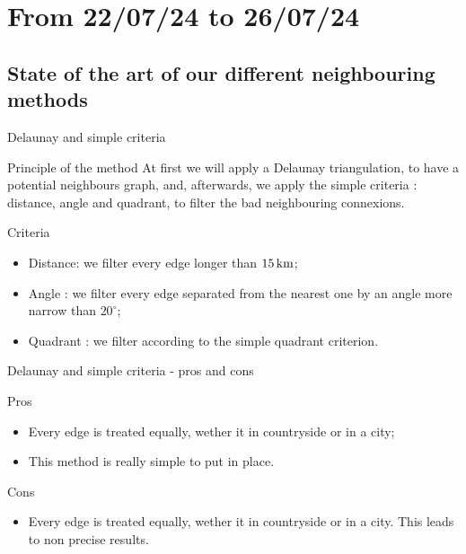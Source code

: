 \smallframetitle

\section{From 22/07/24 to 26/07/24}
\insertsectionframe

\subsection{State of the art of our different neighbouring methods}
\insertsubsectionframe

\begin{frame}{Delaunay and simple criteria}
    \begin{block}{Principle of the method}
        At first we will apply a Delaunay triangulation, to have a potential neighbours graph, and, afterwards, we apply the simple criteria : distance, angle and quadrant,
        to filter the bad neighbouring connexions.
    \end{block}

    \begin{block}{Criteria}
        \begin{itemize}
            \item Distance: we filter every edge longer than $\unit[15]{km}$;
            \item Angle : we filter every edge separated from the nearest one by an angle more narrow than $20^\circ$;
            \item Quadrant : we filter according to the simple quadrant criterion.
        \end{itemize}
    \end{block}
\end{frame}

\begin{frame}{Delaunay and simple criteria - pros and cons}
    \begin{block}{Pros}
        \begin{itemize}
            \item Every edge is treated equally, wether it in countryside or in a city;
            \item This method is really simple to put in place.
        \end{itemize}
    \end{block}

    \begin{block}{Cons}
        \begin{itemize}
            \item Every edge is treated equally, wether it in countryside or in a city. This leads to non precise results.
        \end{itemize}
    \end{block}
\end{frame}

